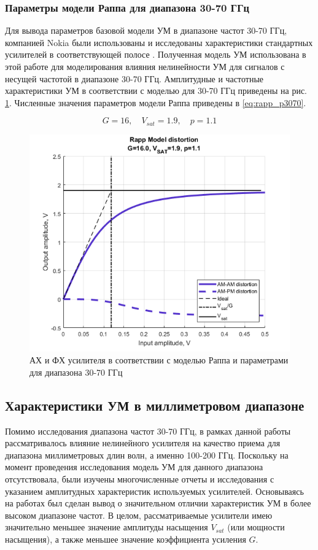 \subsubsection{Параметры модели Раппа для диапазона 30-70 ГГц}
Для вывода параметров базовой модели УМ в диапазоне частот 30-70 ГГц,
компанией Nokia были использованы и исследованы характеристики стандартных
усилителей в соответствующей полосе \cite{nokia163314} \cite{Maltsev2010}.
Полученная модель УМ использована в этой работе для моделирования влияния
нелинейности УМ для сигналов с несущей частотой в диапазоне 30-70 ГГц.
Амплитудные и частотные характеристики УМ в соответствии с моделью
\cite{nokia163314} для 30-70 ГГц приведены на рис. \ref{fig:rapp_nokia}.
Численные значения параметров модели Раппа приведены в \ref{eq:rapp_p3070}.

\begin{equation}
    G = 16, \quad V_{sat} = 1.9, \quad p = 1.1
    \label{eq:rapp_p3070}
\end{equation}

\begin{figure}[h!]
    \centering
    \includegraphics[width=0.7\linewidth]{figs/rapp_nokia.png}
    \caption{АХ и ФХ усилителя в соответствии с моделью Раппа и
    параметрами для диапазона 30-70 ГГц}
    \label{fig:rapp_nokia}
\end{figure}

\subsection{Характеристики УМ в миллиметровом диапазоне}
Помимо исследования диапазона частот 30-70 ГГц, в рамках данной работы
рассматривалось влияние нелинейного усилителя на качество приема для
диапазона миллиметровых длин волн, а именно 100-200 ГГц. Поскольку на
момент проведения исследования модель УМ для данного диапазона
отсутствовала, были изучены многочисленные отчеты и исследования с
указанием амплитудных характеристик используемых усилителей. Основываясь на
работах \cite{zhang2021}\cite{amadorey2018}\cite{aliyun2020} был сделан
вывод о значительном отличии характеристик УМ в более высоком диапазоне
частот. В целом, рассматриваемые усилители имею значительно меньшее
значение амплитуды насыщения $V_{sat}$ (или мощности насыщения), а также
меньшее значение коэффициента усиления $G$.

